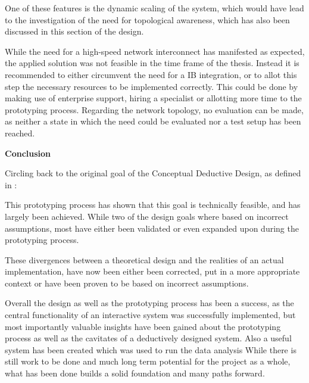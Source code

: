 One of these features is the dynamic scaling of the system, which would have lead to
the investigation of the need for topological awareness, which has also been discussed
in this section of the design.

While the need for a high-speed network interconnect has manifested as expected,
the applied solution was not feasible in the time frame of the thesis.
Instead it is recommended to either circumvent the need for a \ac{IB} integration,
or to allot this step the necessary resources to be implemented correctly.
This could be done by making use of enterprise support, hiring a specialist
or allotting more time to the prototyping process.
Regarding the network topology, no evaluation can be made, as neither
a state in which the need could be evaluated nor a test setup has been reached.


\textbf{Conclusion}

Circling back to the original goal of the Conceptual Deductive Design,
as defined in :

\textit{}

This prototyping process has shown that this goal is technically feasible,
and has largely been achieved. While two of the design goals where based on
incorrect assumptions, most have either been validated or even expanded
upon during the prototyping process.

These divergences between a theoretical design and the realities of an
actual implementation, have now been either been corrected, put in
a more appropriate context or have been proven to be based on incorrect
assumptions.

Overall the design as well as the prototyping process has been a success,
as the central functionality of an interactive system was successfully implemented,
but most importantly valuable insights have been gained about the prototyping process
as well as the cavitates of a deductively designed system.
Also a useful system has been created which was used to run the data analysis
While there is still work to be done and much long term potential for
the project as a whole, what has been done builds a solid foundation
and many paths forward.

